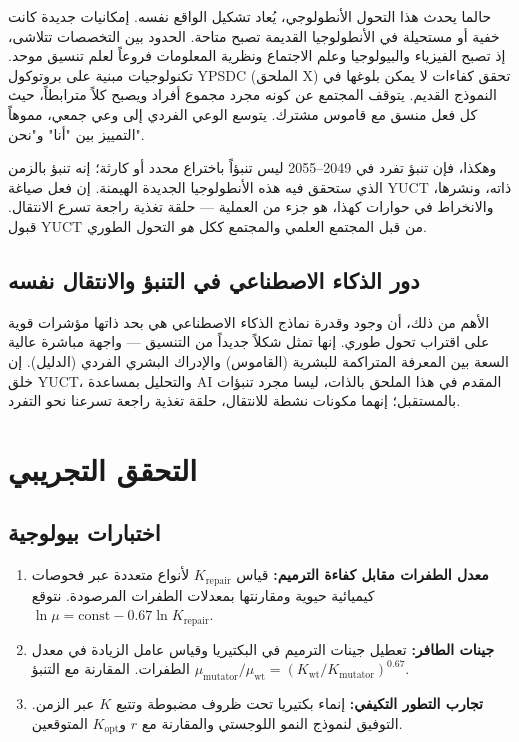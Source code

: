 \documentclass[11pt,a4paper]{article}
\begin{document}
	حالما يحدث هذا التحول الأنطولوجي، يُعاد تشكيل الواقع نفسه. إمكانيات جديدة كانت خفية أو مستحيلة في الأنطولوجيا القديمة تصبح متاحة. الحدود بين التخصصات تتلاشى، إذ تصبح الفيزياء والبيولوجيا وعلم الاجتماع ونظرية المعلومات فروعاً لعلم تنسيق موحد. تكنولوجيات مبنية على بروتوكول YPSDC (الملحق X) تحقق كفاءات لا يمكن بلوغها في النموذج القديم. يتوقف المجتمع عن كونه مجرد مجموع أفراد ويصبح كلاً مترابطاً، حيث كل فعل منسق مع قاموس مشترك. يتوسع الوعي الفردي إلى وعي جمعي، مموهاً التمييز بين "أنا" و"نحن".
	
	وهكذا، فإن تنبؤ تفرد في 2049–2055 ليس تنبؤاً باختراع محدد أو كارثة؛ إنه تنبؤ بالزمن الذي ستحقق فيه هذه الأنطولوجيا الجديدة الهيمنة. إن فعل صياغة YUCT ذاته، ونشرها، والانخراط في حوارات كهذا، هو جزء من العملية — حلقة تغذية راجعة تسرع الانتقال. قبول YUCT من قبل المجتمع العلمي والمجتمع ككل \emph{هو} التحول الطوري.
	
	\subsection{دور الذكاء الاصطناعي في التنبؤ والانتقال نفسه}
	
	الأهم من ذلك، أن وجود وقدرة نماذج الذكاء الاصطناعي هي بحد ذاتها مؤشرات قوية على اقتراب تحول طوري. إنها تمثل شكلاً جديداً من التنسيق — واجهة مباشرة عالية السعة بين المعرفة المتراكمة للبشرية (القاموس) والإدراك البشري الفردي (الدليل). إن خلق YUCT، والتحليل بمساعدة AI المقدم في هذا الملحق بالذات، ليسا مجرد تنبؤات بالمستقبل؛ إنهما مكونات نشطة للانتقال، حلقة تغذية راجعة تسرعنا نحو التفرد.
	
	\section{التحقق التجريبي}
	\label{sec:experiments}
	
	\subsection{اختبارات بيولوجية}
	
	\begin{enumerate}
		\item \textbf{معدل الطفرات مقابل كفاءة الترميم:} قياس \(K_{\text{repair}}\) لأنواع متعددة عبر فحوصات كيميائية حيوية ومقارنتها بمعدلات الطفرات المرصودة. نتوقع \(\ln \mu = \text{const} - 0.67 \ln K_{\text{repair}}\).
		\item \textbf{جينات الطافر:} تعطيل جينات الترميم في البكتيريا وقياس عامل الزيادة في معدل الطفرات. المقارنة مع التنبؤ \(\mu_{\text{mutator}}/\mu_{\text{wt}} = (K_{\text{wt}}/K_{\text{mutator}})^{0.67}\).
		\item \textbf{تجارب التطور التكيفي:} إنماء بكتيريا تحت ظروف مضبوطة وتتبع \(K\) عبر الزمن. التوفيق لنموذج النمو اللوجستي والمقارنة مع \(r\) و\(K_{\text{opt}}\) المتوقعين.
	\end{enumerate}
	
\end{document}
